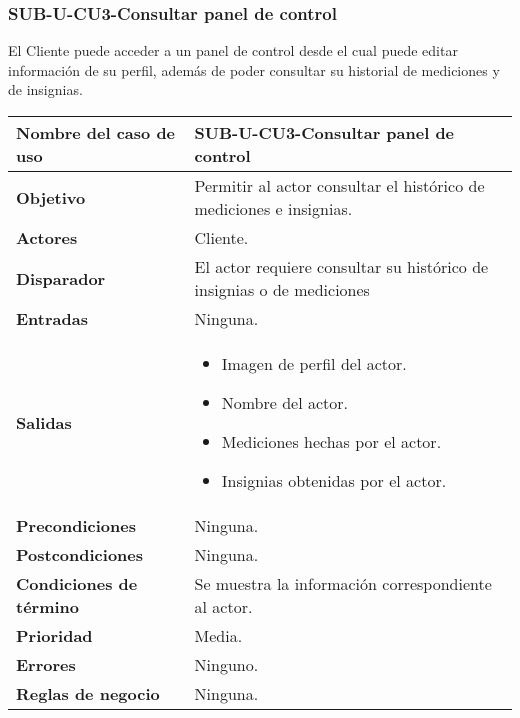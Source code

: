 \subsubsection{SUB-U-CU3-Consultar panel de control}\label{SUB-U-CU3}
El Cliente puede acceder a un panel de control desde el cual puede editar información de su perfil, además de poder consultar su historial de mediciones y de insignias.

\begin{longtable}{|J{5cm}|J{10.3cm}|}
	\hline
	\textbf{Nombre del caso de uso} &
		SUB-U-CU3-Consultar panel de control \\ \hline
	\textbf{Objetivo} &
		Permitir al actor consultar el histórico de mediciones e insignias. \\ \hline
	\textbf{Actores} &
		Cliente. \\ \hline 
	\textbf{Disparador} & 
		El actor requiere consultar su histórico de insignias o de mediciones\\ \hline 
	\textbf{Entradas} & Ninguna.
		\\ \hline 
	\textbf{Salidas} & 
		\begin{itemize}
			\item Imagen de perfil del actor.
			\item Nombre del actor.
			\item Mediciones hechas por el actor.
			\item Insignias obtenidas por el actor.
		\end{itemize} \\ \hline
	\textbf{Precondiciones} &
		Ninguna.\\ \hline
	\textbf{Postcondiciones} & Ninguna.
		\\ \hline
	\textbf{Condiciones de término} & Se muestra la información correspondiente al actor.
		\\ \hline 
	\textbf{Prioridad} & 
		Media. \\ \hline
	\textbf{Errores} & Ninguno.
		\\ \hline
	\textbf{Reglas de negocio} & Ninguna.
		 \\ \hline
\end{longtable}

